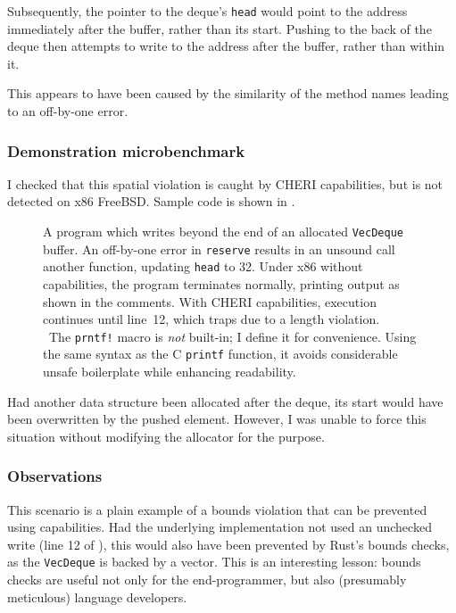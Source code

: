 \documentclass[dissertation.tex]{subfiles}
\begin{document}
Subsequently, the pointer to the deque's \texttt{head} would point to
the address immediately after the buffer, rather than its start.
Pushing to the back of the deque then attempts to write to the address
after the buffer, rather than within it.

This appears to have been caused by the similarity of the method names
leading to an off-by-one error.

\subsubsection{Demonstration microbenchmark}
I checked that this spatial violation is caught by CHERI capabilities,
but is not detected on x86 FreeBSD.
Sample code is shown in .

\begin{figure}[ht]
    
    \caption{
        A program which writes beyond the end of an allocated
        \texttt{VecDeque} buffer.
        An off-by-one error in \texttt{reserve} results in an unsound
        call another function, updating \texttt{head} to 32.
        Under x86 without capabilities, the program terminates normally,
        printing output as shown in the
        comments.{\protect\textsuperscript\textdagger}
        With CHERI capabilities, execution continues until line~12, which
        traps due to a length violation.
        \\ {\footnotesize \protect\textdagger\ The \texttt{prntf!} macro
        is \emph{not} built-in; I define it for convenience. Using the
        same syntax as the C \texttt{printf} function, it avoids
        considerable unsafe boilerplate while enhancing readability.}
    }
    \label{lst:micro-capacity}
\end{figure}

Had another data structure been allocated after the deque, its start
would have been overwritten by the pushed element.
However, I was unable to force this situation without modifying the
allocator for the purpose.

\subsubsection{Observations}
This scenario is a plain example of a bounds violation that can be
prevented using capabilities.
Had the underlying implementation not used an unchecked write (line 12
of ), this would also have been prevented by Rust's
bounds checks, as the \texttt{VecDeque} is backed by a vector.
This is an interesting lesson: bounds checks are useful not only for the
end-programmer, but also (presumably meticulous) language developers.
\end{document}
